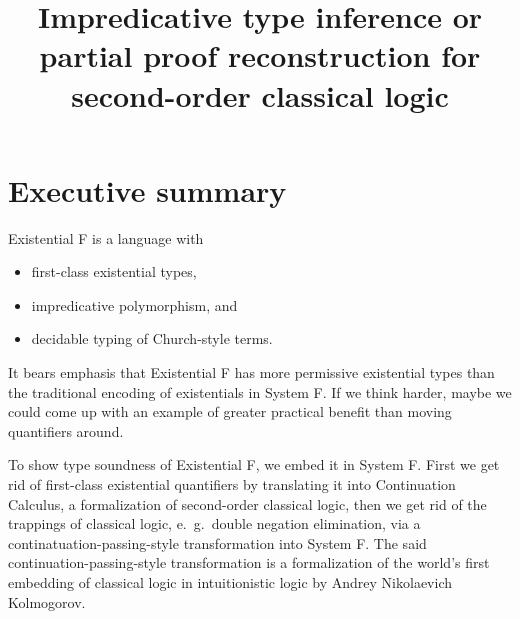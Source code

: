 \documentclass{amsart}
\title
[Impredicative type inference]
{
Impredicative type inference
\break
or
\break
partial proof reconstruction \break
for second-order classical logic
}
\begin{document}
\newcommand{\nc}{\newcommand}
\newcommand{\DotExpr}[2]{#1 #2.\ }
\nc\Abs    {\DotExpr\lambda}
\nc\All    {\DotExpr\forall}
\nc\Allin  {\forall\mathrm{in}}
\nc\Allex  {\forall\mathrm{ex}}
\nc\AppCC  {\mathrm{app/cc}}
\def\Box   {\mathrm{box}}
\nc\Brouwer{\operatorname{Brouwer}}
\nc\CallCC {\mathrm{call/cc}}
\nc\Case   {}
\nc\Cps    {\operatorname{cps}}
\nc\Dn[1]  {(#1 \R \bot) \R \bot}
\nc\Dni    {\mathrm{\neg\neg I}}
\nc\Ex     {\DotExpr\exists}
\nc\Exin   {\exists\mathrm{in}}
\nc\Exex   {\exists\mathrm{ex}}
\nc\FV     {\operatorname{FV}}
\nc\Id     {\mathit{id}}
\nc\Indent {\hspace{3em}}
\nc\Mgs    {\operatorname{mgs}}
\nc\Or     {\ | \ }
\nc\Prune  {\operatorname{prune}}
\nc\Recall {\DotExpr\Xi} %
\nc\Redo   {\operatorname{redo}}
\nc\Tabs   {\DotExpr\Lambda}
\nc\R      {\rightarrow}
\nc\Unbox  {\mathrm{unbox}}
\nc\Undo   {\operatorname{undo}}
\nc\Unify  {\operatorname{unify}}
\maketitle
\tableofcontents

\section{Executive summary}

Existential F is a language with
\begin{itemize}
\item first-class existential types,
\item impredicative polymorphism, and
\item decidable typing of Church-style terms.
\end{itemize}
It bears emphasis that Existential F has more permissive
existential types than the traditional encoding of existentials
in System F. If we think harder, maybe we could come up with an
example of greater practical benefit than moving quantifiers
around.

To show type soundness of Existential F, we embed it in System F.
First we get rid of first-class existential quantifiers by
translating it into Continuation Calculus, a formalization of
second-order classical logic, then we get rid of the trappings of
classical logic, e.~g.\ double negation elimination, via a
continatuation-passing-style transformation into System F. The
said continuation-passing-style transformation is a formalization
of the world's first embedding of classical logic in
intuitionistic logic by Andrey Nikolaevich Kolmogorov.
\end{document}
